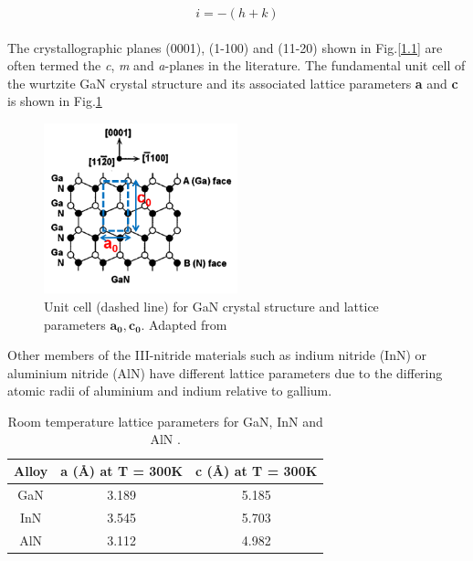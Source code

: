 \begin{equation}
 i = -(h+k)
 \end{equation}
\\
 
The crystallographic planes (0001), (1-100) and (11-20) shown in Fig.\ref{1.1} are often termed the {\it c}, {\it m} and {\it a}-planes in the literature. The fundamental unit cell of the wurtzite GaN crystal structure and its associated lattice parameters \textbf{a} and \textbf{c} is shown in Fig.\ref{1.2}

\begin{figure}[h]
	\centering
	\includegraphics[width=0.5\textwidth]{Figs/Ch1/unit_cell.png}
	\caption {Unit cell (dashed line) for GaN crystal structure and lattice parameters $\mathbf{a_{0}},\mathbf{c_{0}}$. Adapted from \cite{Yu1999}}
	\label{1.2}
\end{figure}
\FloatBarrier

Other members of the III-nitride materials such as indium nitride  (InN) or aluminium nitride  (AlN) have different lattice parameters due to the differing atomic radii of aluminium and indium relative to gallium.

\begin{table}[!htb]
	\centering
	
	\begin{tabular}{ccc}
		Alloy & \textbf{a} (\si{\angstrom}) at T = 300K & \textbf{c} (\si{\angstrom}) at T = 300K \\
		\hline\hline
		GaN   & 3.189   & 5.185   \\
		InN   & 3.545   & 5.703   \\
		AlN   & 3.112  & 4.982  \\ 
		\hline
	\end{tabular}
	\caption{Room temperature lattice parameters for GaN, InN and AlN \cite{Vurgaftman2003}.}
	\label{tab1.1}
\end{table}

